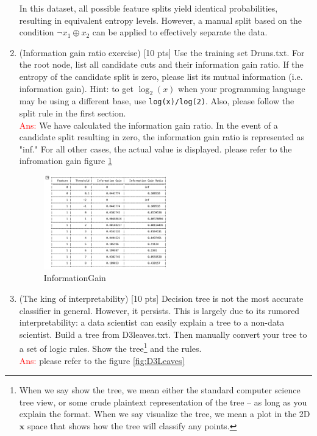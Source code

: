 \documentclass[a4paper]{article}
\theoremstyle{definition}
\newcommand{\red}[1]{\textcolor{red}{#1}}
\def\x{\mathbf x}
\begin{document}
\begin{enumerate}
In this dataset, all possible feature splits yield identical probabilities, resulting in equivalent entropy levels. However, a manual split based on the condition $\neg x_1 \oplus x_2$ can be applied to effectively separate the data.



\item (Information gain ratio exercise)  [10 pts] Use the training set Druns.txt.  For the root node, list all candidate cuts and their information gain ratio. If the entropy of the candidate split is zero, please list its mutual information (i.e. information gain). Hint: to get $\log_2(x)$ when your programming language may be using a different base, use \verb|log(x)/log(2)|. Also, please follow the split rule in the first section. \\


\red{Ans:} 
We have calculated the information gain ratio. In the event of a candidate split resulting in zero, the information gain ratio is represented as "inf." For all other cases, the actual value is displayed.  please refer to the infromation gain figure \ref{fig:InformationGain}

\begin{figure}[htbp]
  \centering
  \includegraphics[width=0.5\textwidth]{Q2.3.png}
  \caption{InformationGain}
  \label{fig:InformationGain}
\end{figure}







\item (The king of interpretability)  [10 pts] Decision tree is not the most accurate classifier in general.  However, it persists.  This is largely due to its rumored interpretability: a data scientist can easily explain a tree to a non-data scientist.  Build a tree from D3leaves.txt.  Then manually convert your tree to a set of logic rules.  Show the tree\footnote{When we say show the tree, we mean either the standard computer science tree view, or some crude plaintext representation of the tree -- as long as you explain the format.  When we say visualize the tree, we mean a plot in the 2D $\x$ space that shows how the tree will classify any points.} and the rules. \\
\red{Ans:} 
 please refer to the figure \ref{fig:D3Leaves}


\end{enumerate}
\end{document}
